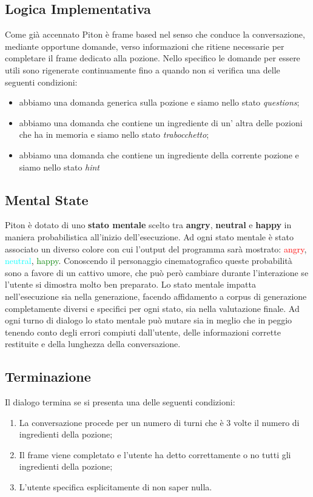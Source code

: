 \subsection{Logica Implementativa}
Come già accennato Piton è frame based nel senso che conduce la conversazione, mediante opportune domande, verso informazioni che ritiene necessarie per completare il frame dedicato alla pozione. Nello specifico le domande per essere utili sono rigenerate continuamente fino a quando non si verifica una delle seguenti condizioni:
\begin{itemize}
    \item abbiamo una domanda generica sulla pozione e siamo nello stato \textit{questions};
    \item abbiamo una domanda che contiene un ingrediente di un' altra delle pozioni che ha in memoria e siamo nello stato \textit{trabocchetto};
    \item abbiamo una domanda che contiene un ingrediente della corrente pozione e siamo nello stato \textit{hint}
\end{itemize}
\subsection{Mental State}
Piton è dotato di uno \textbf{stato mentale} scelto tra \textbf{angry}, \textbf{neutral} e \textbf{happy} in maniera probabilistica all'inizio dell'esecuzione. Ad ogni stato mentale è stato associato un diverso colore con cui l'output del programma sarà mostrato: \textcolor{red}{angry}, \textcolor{cyan}{neutral}, \textcolor{green}{happy}.
Conoscendo il personaggio cinematografico queste probabilità sono a favore di un cattivo umore, che può però cambiare durante l'interazione se l'utente si dimostra molto ben preparato. Lo stato mentale impatta nell'esecuzione sia nella generazione, facendo affidamento a corpus di generazione completamente diversi e specifici per ogni stato, sia nella valutazione finale. Ad ogni turno di dialogo lo stato mentale può mutare sia in meglio che in peggio tenendo conto degli errori compiuti dall'utente, delle informazioni corrette restituite e della lunghezza della conversazione. 
\subsection{Terminazione}
Il dialogo termina se si presenta una delle seguenti condizioni:
\begin{enumerate}
    \item La conversazione procede per un numero di turni che è 3 volte il numero di ingredienti della pozione;
    \item Il frame viene completato e l'utente ha detto correttamente o no tutti gli ingredienti della pozione;
    \item L'utente specifica esplicitamente di non saper nulla.
\end{enumerate}

